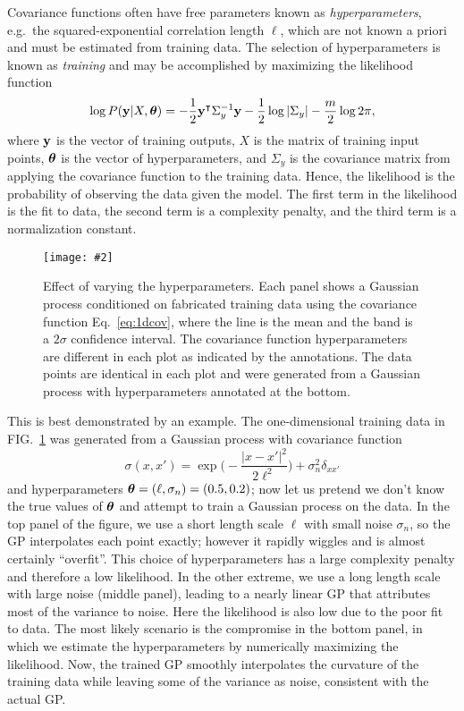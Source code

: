 \documentclass[aps,prc,reprint,superscriptaddress,amsmath]{revtex4-1}
\newcommand{\colfig}[3][t]{
  \begin{figure}[#1]
    \texttt{[image: \#2]}
    \caption{\label{fig:#2}#3}
  \end{figure}
}
\newcommand{\tran}{^\intercal}
\begin{document}
Covariance functions often have free parameters known as \emph{hyperparameters}, e.g.\ the squared-exponential correlation length $\ell$,
which are not known a priori and must be estimated from training data.
The selection of hyperparameters is known as \emph{training} and may be accomplished by maximizing the likelihood function \cite{Rasmussen:2006gp}
\begin{equation}
  \log P(\y|X,\vectheta) = -\frac{1}{2} \y\tran \Sigma_y^{-1} \y - \frac{1}{2} \log |\Sigma_y| - \frac{m}{2} \log 2\pi,
  \label{eq:train_like}
\end{equation}
where $\mathbf y$ is the vector of training outputs, $X$ is the matrix of training input points, $\boldsymbol\theta$ is the vector of hyperparameters, and $\Sigma_y$ is the covariance matrix from applying the covariance function to the training data.
Hence, the likelihood is the probability of observing the data given the model.
The first term in the likelihood is the fit to data, the second term is a complexity penalty, and the third term is a normalization constant.

\colfig{training}{
  Effect of varying the hyperparameters.
  Each panel shows a Gaussian process conditioned on fabricated training data using the covariance function Eq.~\eqref{eq:1dcov}, where the line is the mean and the band is a $2\sigma$ confidence interval.
  The covariance function hyperparameters are different in each plot as indicated by the annotations.
  The data points are identical in each plot and were generated from a Gaussian process with hyperparameters annotated at the bottom.
}

This is best demonstrated by an example.
The one-dimensional training data in FIG.~\ref{fig:training} was generated from a Gaussian process with covariance function
\begin{equation}
  \sigma(x, x') = \exp\biggl( -\frac{|x - x'|^2}{2\ell^2} \biggr) + \sigma_n^2\delta_{xx'}
  \label{eq:1dcov}
\end{equation}
and hyperparameters $\boldsymbol\theta = (\ell, \sigma_n) = (0.5, 0.2)$; now let us pretend we don't know the true values of $\boldsymbol\theta$ and attempt to train a Gaussian process on the data.
In the top panel of the figure, we use a short length scale $\ell$ with small noise $\sigma_n$, so the GP interpolates each point exactly; however it rapidly wiggles and is almost certainly ``overfit''.
This choice of hyperparameters has a large complexity penalty and therefore a low likelihood.
In the other extreme, we use a long length scale with large noise (middle panel), leading to a nearly linear GP that attributes most of the variance to noise.
Here the likelihood is also low due to the poor fit to data.
The most likely scenario is the compromise in the bottom panel, in which we estimate the hyperparameters by numerically maximizing the likelihood.
Now, the trained GP smoothly interpolates the curvature of the training data while leaving some of the variance as noise, consistent with the actual GP.
\end{document}
